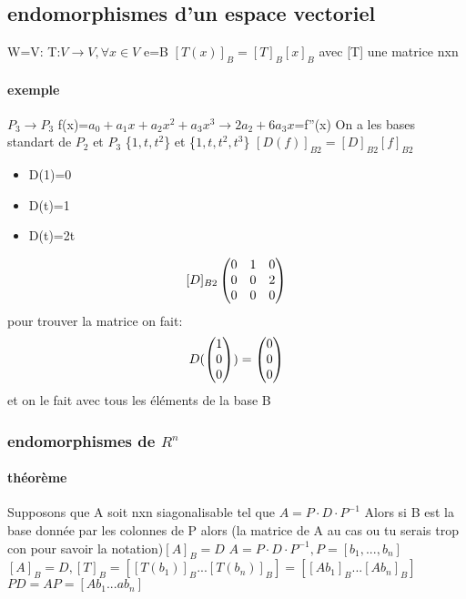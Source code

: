 \documentclass[a4paper,10pt]{article}
\begin{document}
\subsection{endomorphismes d'un espace vectoriel}
W=V: T:$V\to V,\forall x\in V$
\newline
e=B
\newline
$[T(x)]_B=[T]_B[x]_B$
\newline
avec [T] une matrice nxn
\paragraph{exemple}
$P_3\to P_3$ f(x)=$a_0+a_1x+a_2x^2+a_3x^3\to 2a_2+6a_3x$=f''(x)
\newline
On a les bases standart de $P_2$ et $P_3$ \{$1,t,t^2$\} et \{$1,t,t^2,t^3$\}
\newline
$[D(f)]_{B2}=[D]_{B2}[f]_{B2}$
\begin{itemize}
 \item D(1)=0
 \item D(t)=1
 \item D(t)=2t
\end{itemize}
\[
[D]_{B2}
\begin{pmatrix}
 0&1&0\cr
 0&0&2\cr
 0&0&0\cr
\end{pmatrix}
\]
\newline
pour trouver la matrice on fait:
\newline
\[
D(\begin{pmatrix}
   1\cr
   0\cr
   0\cr
  \end{pmatrix}
)
=\begin{pmatrix}
  0\cr
  0\cr
  0\cr
 \end{pmatrix}
\]
\newline
et on le fait avec tous les éléments de la base B
\subsubsection{endomorphismes de $R^n$}
\paragraph{théorème}
Supposons que A soit nxn siagonalisable tel que $A=P\cdot D\cdot P^{-1}$
\newline
Alors si B est la base donnée par les colonnes de P alors (la matrice de A au cas ou tu serais trop con pour savoir la notation)$[A]_B=D$
\newline
$A=P\cdot D\cdot P^{-1}, P=[b_1,...,b_n]$
\newline
$[A]_B=D, [T]_B=[[T(b_1)]_B...[T(b_n)]_B]=[[Ab_1]_B...[Ab_n]_B]$
\newline
$PD=AP=[Ab_1...ab_n]$
\end{document}
